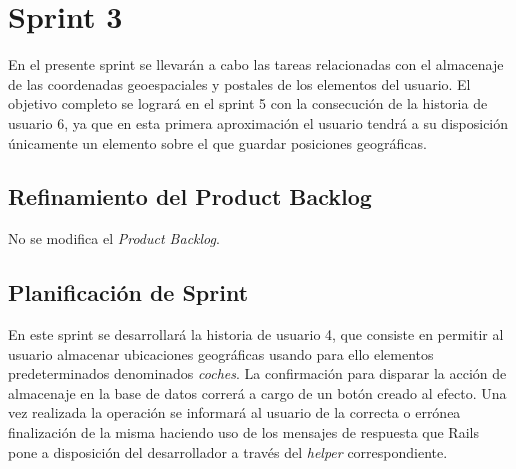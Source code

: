\section{Sprint 3}
En el presente sprint se llevarán a cabo las tareas relacionadas con el almacenaje de las coordenadas geoespaciales y postales de los elementos del usuario. El objetivo completo se logrará en el sprint 5 con la consecución de la historia de usuario 6, ya que en esta primera aproximación el usuario tendrá a su disposición únicamente un elemento sobre el que guardar posiciones geográficas.

	\subsection{Refinamiento del Product Backlog}
	No se modifica el \textit{Product Backlog}.
	
	\subsection{Planificación de Sprint}
	En este sprint se desarrollará la historia de usuario 4, que consiste en permitir al usuario almacenar ubicaciones geográficas usando para ello elementos predeterminados denominados \textit{coches}. 
	La confirmación para disparar la acción de almacenaje en la base de datos correrá a cargo de un botón creado al efecto.
	Una vez realizada la operación se informará al usuario de la correcta o errónea finalización de la misma haciendo uso de los mensajes de respuesta que Rails pone a disposición del desarrollador a través del \textit{helper} correspondiente.
	
